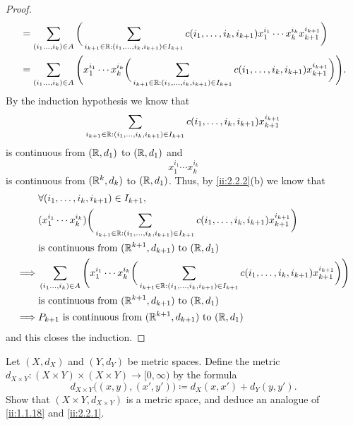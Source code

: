 \begin{proof}
\begin{align*}
     & = \sum_{(i_1 \dots, i_k) \in A} \bigg(\sum_{i_{k + 1} \in \mathbb{R} : (i_1, \dots, i_k, i_{k + 1}) \in I_{k + 1}} c(i_1, \dots, i_k, i_{k + 1}) x_1^{i_1} \cdots x_k^{i_k} x_{k + 1}^{i_{k + 1}}\bigg)              \\
     & = \sum_{(i_1 \dots, i_k) \in A} \Bigg(x_1^{i_1} \cdots x_k^{i_k} \bigg(\sum_{i_{k + 1} \in \mathbb{R} : (i_1, \dots, i_k, i_{k + 1}) \in I_{k + 1}} c(i_1, \dots, i_k, i_{k + 1}) x_{k + 1}^{i_{k + 1}}\bigg)\Bigg).
  \end{align*}
  By the induction hypothesis we know that
  \[
    \sum_{i_{k + 1} \in \mathbb{R} : (i_1, \dots, i_k, i_{k + 1}) \in I_{k + 1}} c(i_1, \dots, i_k, i_{k + 1}) x_{k + 1}^{i_{k + 1}}
  \]
  is continuous from \((\mathbb{R}, d_1)\) to \((\mathbb{R}, d_1)\) and
  \[
    x_1^{i_1} \cdots x_k^{i_k}
  \]
  is continuous from \((\mathbb{R}^k, d_k)\) to \((\mathbb{R}, d_1)\).
  Thus, by \cref{ii:2.2.2}(b) we know that
  \begin{align*}
             & \forall (i_1, \dots, i_k, i_{k + 1}) \in I_{k + 1},                                                                                                                                                       \\
             & (x_1^{i_1} \cdots x_k^{i_k}) \bigg(\sum_{i_{k + 1} \in \mathbb{R} : (i_1, \dots, i_k, i_{k + 1}) \in I_{k + 1}} c(i_1, \dots, i_k, i_{k + 1}) x_{k + 1}^{i_{k + 1}}\bigg)                                         \\
             & \text{is continuous from } (\mathbb{R}^{k + 1}, d_{k + 1}) \text{ to } (\mathbb{R}, d_1)                                                                                                                                  \\
    \implies & \sum_{(i_1 \dots, i_k) \in A} \Bigg(x_1^{i_1} \cdots x_k^{i_k} \bigg(\sum_{i_{k + 1} \in \mathbb{R} : (i_1, \dots, i_k, i_{k + 1}) \in I_{k + 1}} c(i_1, \dots, i_k, i_{k + 1}) x_{k + 1}^{i_{k + 1}}\bigg)\Bigg) \\
             & \text{is continuous from } (\mathbb{R}^{k + 1}, d_{k + 1}) \text{ to } (\mathbb{R}, d_1)                                                                                                                                  \\
    \implies & P_{k + 1} \text{ is continuous from } (\mathbb{R}^{k + 1}, d_{k + 1}) \text{ to } (\mathbb{R}, d_1)
  \end{align*}
  and this closes the induction.
\end{proof}

\begin{ex}\label{ii:ex:2.2.8}
  Let \((X, d_X)\) and \((Y, d_Y)\) be metric spaces.
  Define the metric \(d_{X \times Y} : (X \times Y) \times (X \times Y) \to [0, \infty)\) by the formula
  \[
    d_{X \times Y}\big((x, y), (x', y')\big) \coloneqq d_X(x, x') + d_Y(y, y').
  \]
  Show that \((X \times Y, d_{X \times Y})\) is a metric space, and deduce an analogue of \cref{ii:1.1.18} and \cref{ii:2.2.1}.
\end{ex}


